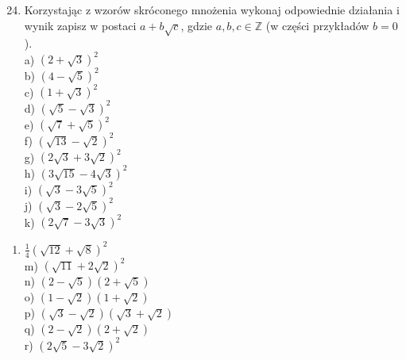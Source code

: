 \documentclass[10pt]{article}
\begin{document}
\begin{enumerate}
  \setcounter{enumi}{23}
  \item Korzystając z wzorów skróconego mnożenia wykonaj odpowiednie działania i wynik zapisz w postaci \(a+b \sqrt{c}\), gdzie \(a, b, c \in \mathbb{Z}\) (w części przykładów \(b=0\) ).\\
a) \((2+\sqrt{3})^{2}\)\\
b) \((4-\sqrt{5})^{2}\)\\
c) \((1+\sqrt{3})^{2}\)\\
d) \((\sqrt{5}-\sqrt{3})^{2}\)\\
e) \((\sqrt{7}+\sqrt{5})^{2}\)\\
f) \((\sqrt{13}-\sqrt{2})^{2}\)\\
g) \((2 \sqrt{3}+3 \sqrt{2})^{2}\)\\
h) \((3 \sqrt{15}-4 \sqrt{3})^{2}\)\\
i) \((\sqrt{3}-3 \sqrt{5})^{2}\)\\
j) \((\sqrt{3}-2 \sqrt{5})^{2}\)\\
k) \((2 \sqrt{7}-3 \sqrt{3})^{2}\)
\end{enumerate}

\begin{enumerate}
  \item \(\frac{1}{4}(\sqrt{12}+\sqrt{8})^{2}\)\\
m) \((\sqrt{11}+2 \sqrt{2})^{2}\)\\
n) \((2-\sqrt{5})(2+\sqrt{5})\)\\
o) \((1-\sqrt{2})(1+\sqrt{2})\)\\
p) \((\sqrt{3}-\sqrt{2})(\sqrt{3}+\sqrt{2})\)\\
q) \((2-\sqrt{2})(2+\sqrt{2})\)\\
r) \((2 \sqrt{5}-3 \sqrt{2})^{2}\)
\end{enumerate}
\end{document}
